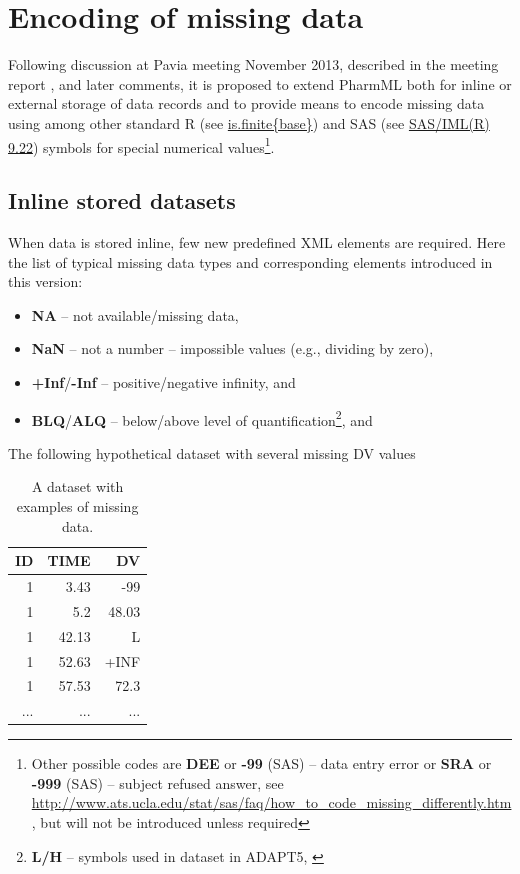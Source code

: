 \section{Encoding of missing data}
Following discussion at Pavia meeting November 2013, described in the meeting 
report \cite{Swat:2013pavia}, and later comments, it is proposed to extend 
PharmML both for inline or external storage of data records and to provide means 
to encode missing data using among other standard R (see 
\href{https://stat.ethz.ch/R-manual/R-devel/library/base/html/is.finite.html}{is.finite\{base\}}) 
and SAS (see \href{http://support.sas.com/documentation/cdl/en/imlug/63541/HTML/default/viewer.htm#imlug_r_sect019.htm}{SAS/IML(R) 9.22}) symbols for special numerical 
values\footnote{Other possible codes are \textbf{DEE} or \textbf{-99} (SAS) -- data entry 
error or \textbf{SRA} or \textbf{-999} (SAS) -- subject refused answer, see \url{http://www.ats.ucla.edu/stat/sas/faq/how_to_code_missing_differently.htm}, but will not be 
introduced unless required}.

\subsection{Inline stored datasets}
When data is stored inline, few new predefined XML elements are required. Here the 
list of typical missing data types and corresponding elements introduced in this version:
\begin{itemize}
\item
\textbf{NA} -- not available/missing data, 
\item
\textbf{NaN} -- not a number -- impossible values (e.g., dividing by zero), 
\item
\textbf{+Inf}/\textbf{-Inf}  -- positive/negative infinity,  and 
\item
\textbf{BLQ}/\textbf{ALQ} -- below/above level of quantification\footnote{\textbf{L/H} -- symbols used in dataset in ADAPT5, \cite{DArgenio:2009aa}},  and 
\end{itemize}
The following hypothetical dataset with several missing DV values
\begin{table}[htdp]
\begin{center}
\small
\renewcommand{\arraystretch}{1.1}%
\begin{tabular}{rrr}
\hline
ID 	& TIME	& DV	 \\ 
\hline
1 	& 3.43 		& -99 	\\ 
1 	& 5.2 		& 48.03 	 \\ 
1 	& 42.13 		& L	 \\ 
1 	& 52.63 		& +INF 	 \\ 
1 	& 57.53 		& 72.3  \\ 
...	& ...		& ...	\\ 
\hline
\end{tabular}
\end{center}
\vspace{-1em}\caption{A dataset with examples of missing data.}
\label{tab:uslessDataSet}
\end{table}%

